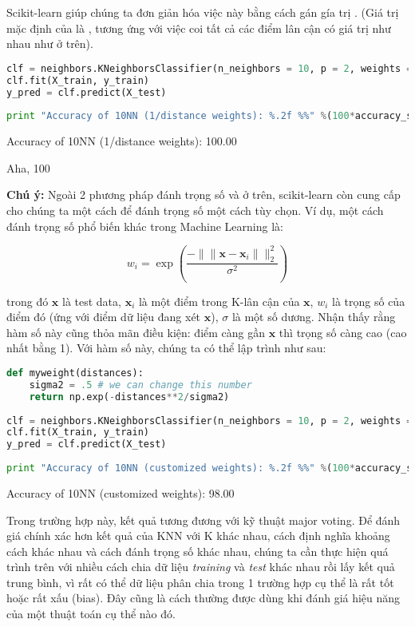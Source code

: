 Scikit-learn giúp chúng ta đơn giản hóa việc này bằng cách gán gía trị . (Giá trị mặc định của  là , tương ứng với việc coi tất cả các điểm lân cận có giá trị như nhau như ở trên). 
 
 
\begin{lstlisting}[language=Python]
clf = neighbors.KNeighborsClassifier(n_neighbors = 10, p = 2, weights = 'distance') 
clf.fit(X_train, y_train) 
y_pred = clf.predict(X_test) 
 
print "Accuracy of 10NN (1/distance weights): %.2f %%" %(100*accuracy_score(y_test, y_pred)) 
\end{lstlisting}
 
    Accuracy of 10NN (1/distance weights): 100.00 %
 
 
Aha, 100%
 
\textbf{Chú ý:} Ngoài 2 phương pháp đánh trọng số  và  ở trên, scikit-learn còn cung cấp cho chúng ta một cách để đánh trọng số một cách tùy chọn. Ví dụ, một cách đánh trọng số phổ biến khác trong Machine Learning là: 
 
\begin{equation*} 
w_i = \exp \left( \frac{-\|\|\mathbf{x} - \mathbf{x}_i\|\|_2^2}{\sigma^2} \right) 
\end{equation*} 
 
trong đó $\mathbf{x}$ là test data, $\mathbf{x}_i$ là một điểm trong K-lân cận của $\mathbf{x}$, $w_i$ là trọng số của điểm đó (ứng với điểm dữ liệu đang xét $\mathbf{x}$), $\sigma$ là một số dương. Nhận thấy rằng hàm số này cũng thỏa mãn điều kiện: điểm càng gần $\mathbf{x}$ thì trọng số càng cao (cao nhất bằng 1). Với hàm số này, chúng ta có thể lập trình như sau: 
 
 
\begin{lstlisting}[language=Python]
def myweight(distances): 
    sigma2 = .5 # we can change this number 
    return np.exp(-distances**2/sigma2) 
 
clf = neighbors.KNeighborsClassifier(n_neighbors = 10, p = 2, weights = myweight) 
clf.fit(X_train, y_train) 
y_pred = clf.predict(X_test) 
 
print "Accuracy of 10NN (customized weights): %.2f %%" %(100*accuracy_score(y_test, y_pred)) 
\end{lstlisting}
 
    Accuracy of 10NN (customized weights): 98.00 %
 
 
Trong trường hợp này, kết quả tương đương với kỹ thuật major voting. Để đánh giá chính xác hơn kết quả của KNN với K khác nhau, cách định nghĩa khoảng cách khác nhau và cách đánh trọng số khác nhau, chúng ta cần thực hiện quá trình trên với nhiều cách chia dữ liệu \textit{training} và \textit{test} khác nhau rồi lấy kết quả trung bình, vì rất có thể dữ liệu phân chia trong 1 trường hợp cụ thể là rất tốt hoặc rất xấu (bias). Đây cũng là cách thường được dùng khi đánh giá hiệu năng của một thuật toán cụ thể nào đó. 
 
